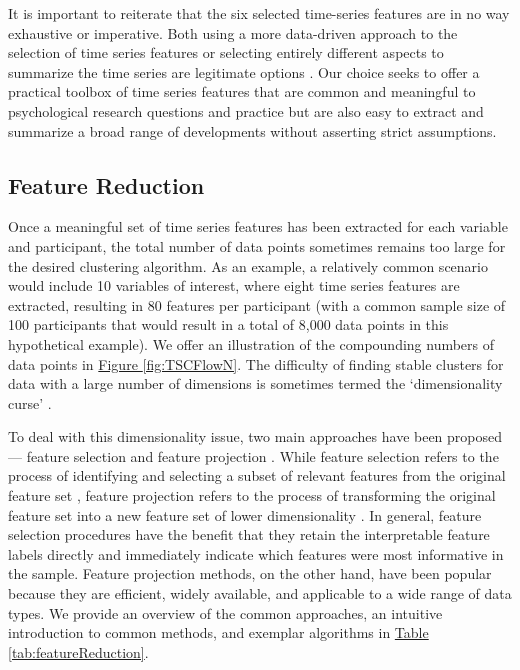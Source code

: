 \documentclass[man, 12pt, a4paper, floatsintext]{apa7}
\theoremstyle{break}
\theoremstyle{plain}
\newcommand{\fgrref}[2][]{\hyperref[#2]{Figure \ref*{#2}#1}}
\newcommand{\tblref}[2][]{\hyperref[#2]{Table \ref*{#2}#1}}
\begin{document}
It is important to reiterate that the six selected time-series features are in no way exhaustive or imperative. Both using a more data-driven approach to the selection of time series features or selecting entirely different aspects to summarize the time series are legitimate options \citep[e.g., see][]{heylen2016}. Our choice seeks to offer a practical toolbox of time series features that are common and meaningful to psychological research questions and practice but are also easy to extract and summarize a broad range of developments without asserting strict assumptions.

\subsection{Feature Reduction}
Once a meaningful set of time series features has been extracted for each variable and participant, the total number of data points sometimes remains too large for the desired clustering algorithm. As an example, a relatively common scenario would include 10 variables of interest, where eight time series features are extracted, resulting in 80 features per participant (with a common sample size of 100 participants that would result in a total of 8,000 data points in this hypothetical example). We offer an illustration of the compounding numbers of data points in \fgrref{fig:TSCFlowN}. The difficulty of finding stable clusters for data with a large number of dimensions is sometimes termed the `dimensionality curse' \citep[e.g.,][]{altman2018}. 

To deal with this dimensionality issue, two main approaches have been proposed --- feature selection and feature projection \citep[e.g.,][]{erdogmus2008}. While feature selection refers to the process of identifying and selecting a subset of relevant features from the original feature set \citep{alelyani2014}, feature projection refers to the process of transforming the original feature set into a new feature set of lower dimensionality \citep[][]{carreira-perpinan1997}. In general, feature selection procedures have the benefit that they retain the interpretable feature labels directly and immediately indicate which features were most informative in the sample. Feature projection methods, on the other hand, have been popular because they are efficient, widely available, and applicable to a wide range of data types. We provide an overview of the common approaches, an intuitive introduction to common methods, and exemplar algorithms in \tblref{tab:featureReduction}. 
\end{document}

